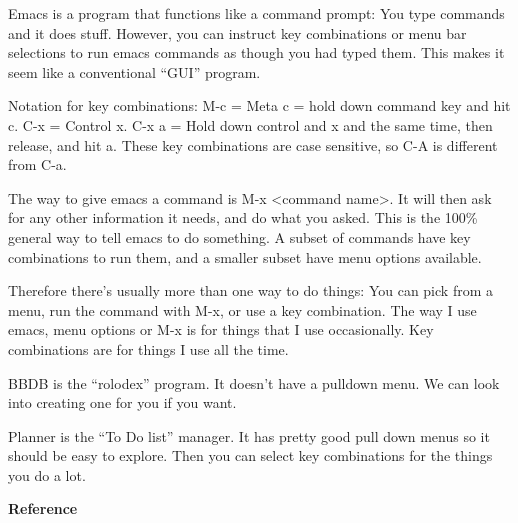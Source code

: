 \documentclass{article}
\begin{document}
Emacs is a program that functions like a command prompt: You type
commands and it does stuff.  However, you can instruct key
combinations or menu bar selections to run emacs commands as though
you had typed them.  This makes it seem like a conventional ``GUI''
program.

Notation for key combinations: M-c = Meta c = hold down command key
and hit c.  C-x = Control x.  C-x a = Hold down control and x and the
same time, then release, and hit a.  These key combinations are case
sensitive, so C-A is different from C-a.

The way to give emacs a command is M-x <command name>.  It will then
ask for any other information it needs, and do what you asked.  This
is the 100\% general way to tell emacs to do something.  A subset of
commands have key combinations to run them, and a smaller subset have
menu options available.

Therefore there's usually more than one way to do things: You can pick
from a menu, run the command with M-x, or use a key combination.  The
way I use emacs, menu options or M-x is for things that I use
occasionally.  Key combinations are for things I use all the time.

BBDB is the ``rolodex'' program.  It doesn't have a pulldown menu.  We
can look into creating one for you if you want.

Planner is the ``To Do list'' manager.  It has pretty good pull down
menus so it should be easy to explore.  Then you can select key
combinations for the things you do a lot.

\clearpage

{\bf \Large Reference}
\end{document}

